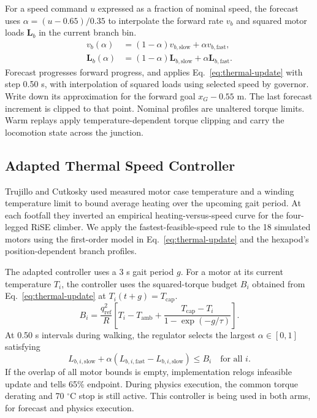\documentclass{ieeeaccess}
\begin{document}
For a speed command $u$ expressed as a fraction of nominal speed, the forecast uses $\alpha=(u-0.65)/0.35$ to interpolate the forward rate $v_b$ and squared motor loads $\mathbf{L}_b$ in the current branch bin.
\begin{align}
 v_b(\alpha)&=(1-\alpha)v_{b,\mathrm{slow}}+\alpha v_{b,\mathrm{fast}},\\
 \mathbf{L}_b(\alpha)&=(1-\alpha)\mathbf{L}_{b,\mathrm{slow}}
                        +\alpha\mathbf{L}_{b,\mathrm{fast}} .
\end{align}
Forecast progresses forward progress, and applies Eq.~\eqref{eq:thermal-update} with step 0.50 s, with interpolation of squared loads using selected speed by governor. Write down its approximation for the forward goal $x_G-0.55$ m. The last forecast increment is clipped to that point. Nominal profiles are unaltered torque limits. Warm replays apply temperature-dependent torque clipping and carry the locomotion state across the junction.

\subsection{Adapted Thermal Speed Controller}

Trujillo and Cutkosky \cite[Sec.~III-D, Eq.~(8)]{trujillo2009} used measured motor case temperature and a winding temperature limit to bound average heating over the upcoming gait period. At each footfall they inverted an empirical heating-versus-speed curve for the four-legged RiSE climber. We apply the fastest-feasible-speed rule to the 18 simulated motors using the first-order model in Eq.~\eqref{eq:thermal-update} and the hexapod's position-dependent branch profiles.

The adapted controller uses a 3 s gait period $g$. For a motor at its current temperature $T_i$, the controller uses the squared-torque budget $B_i$ obtained from Eq.~\eqref{eq:thermal-update} at $T_i(t+g)=T_{\mathrm{cap}}$.
\begin{equation}
B_i = \frac{q_{\mathrm{ref}}^2}{R}
    \left[T_i-T_{\mathrm{amb}}
      +\frac{T_{\mathrm{cap}}-T_i}{1-\exp(-g/\tau)}\right].
\label{eq:squared-torque-budget}
\end{equation}
At 0.50 s intervals during walking, the regulator selects the largest $\alpha\in[0,1]$ satisfying
\begin{equation}
L_{b,i,\mathrm{slow}}+\alpha
  (L_{b,i,\mathrm{fast}}-L_{b,i,\mathrm{slow}})\leq B_i
  \quad\text{for all }i .
\label{eq:speed-constraints}
\end{equation}
If the overlap of all motor bounds is empty, implementation relogs infeasible update and tells 65\% endpoint. During physics execution, the common torque derating and 70 \ensuremath{{}^{\circ}\mathrm{C}} stop is still active. This controller is being used in both arms, for forecast and physics execution.
\end{document}
